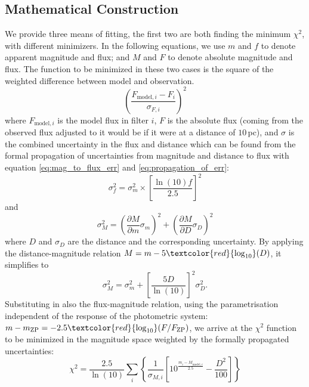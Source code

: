 \documentclass[fleqn,usenatbib]{rasti}
\begin{document}
\subsection{Mathematical Construction}
We provide three means of fitting, the first two are both finding the minimum
$\chi^2$, with different minimizers. In the following equations, we use $m$ and
$f$ to denote apparent magnitude and flux; and $M$ and $F$ to denote absolute
magnitude and flux. The function to be minimized in these two cases is the
square of the weighted difference between model and observation.
\begin{equation}
    \label{eq:lsq}
    \left(\dfrac{F_{\mathrm{model}, i} - F_{i}}{\sigma_{F, i}}\right)^{2}
\end{equation}
where $F_{\mathrm{model}, i}$ is the model flux in filter $i$, $F$ is the
absolute flux (coming from the observed flux adjusted to it would be if it
were at a distance of $10\,$pc), and $\sigma$ is the combined uncertainty in
the flux and distance which can be found from the formal propagation of
uncertainties from magnitude and distance to flux with
equation \ref{eq:mag_to_flux_err} and
\ref{eq:propagation_of_err}:
\begin{equation}
    \label{eq:mag_to_flux_err}
    \sigma_{f}^{2} = \sigma_{m}^{2} \times \left[ \dfrac{\ln(10) f}{2.5} \right]^{2}
\end{equation}
and
\begin{equation}
    \label{eq:propagation_of_err}
    \sigma_{M}^{2} = \left( \dfrac{\partial M}{\partial m} \sigma_{m} \right)^2 + \left( \dfrac{\partial M}{\partial D} \sigma_{D} \right)^2
\end{equation}
where $D$ and $\sigma_D$ are the distance and the corresponding uncertainty. By
applying the distance-magnitude relation $M = m - 5\textcolor{red}{\log_{10}}(D)$, it simplifies to
\begin{equation}
    \label{eq:mag_err}
    \sigma_{M}^2 = \sigma^2_{m} + \left[ \dfrac{5 D}{\ln(10)} \right]^2 \sigma_{D}^2.
\end{equation}
Substituting in also the flux-magnitude relation, using the parametrisation
independent of the response of the photometric system: $m - m_{\mathrm{ZP}}=-2.5\textcolor{red}{\log_{10}}(F/F_{\mathrm{ZP}})$,
we arrive at the $\chi^2$ function to be minimized in the magnitude space weighted
by the formally propagated uncertainties:
\begin{equation}
    \label{eq:chi2}
    \chi^{2} = \dfrac{2.5}{\ln(10)} \sum_{i}\left\{ \dfrac{1}{\sigma_{M, i}} \left[ 10^{\frac{m_{i} - M_{\mathrm{model}, i}}{2.5}} - \dfrac{D^{2}}{100} \right] \right\}
\end{equation}
\end{document}
